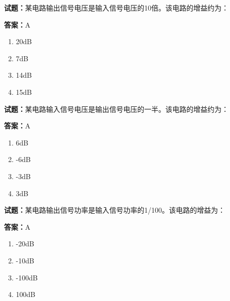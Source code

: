 \documentclass{ctexbook}
\begin{document}




\vspace{1em}

\textbf{试题：}某电路输出信号电压是输入信号电压的10倍。该电路的增益约为： 

\textbf{答案：}A 

\begin{enumerate}[leftmargin=3em]
  \item 20dB 

  \item 7dB 

  \item 14dB 

  \item 15dB 

\end{enumerate}





\vspace{1em}

\textbf{试题：}某电路输入信号电压是输出信号电压的一半。该电路的增益约为： 

\textbf{答案：}A 

\begin{enumerate}[leftmargin=3em]
  \item 6dB 

  \item -6dB 

  \item -3dB 

  \item 3dB 

\end{enumerate}





\vspace{1em}

\textbf{试题：}某电路输出信号功率是输入信号功率的1/100。该电路的增益为： 

\textbf{答案：}A 

\begin{enumerate}[leftmargin=3em]
  \item -20dB 

  \item -10dB 

  \item -100dB 

  \item 100dB 

\end{enumerate}
\end{document}
